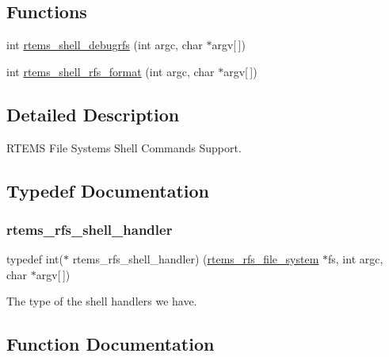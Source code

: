 \subsection*{Functions}
\begin{DoxyCompactItemize}
\item 
int \mbox{\hyperlink{rtems-rfs-shell_8c_a39d9f39a696171d278ab3fb462043af6}{rtems\+\_\+shell\+\_\+debugrfs}} (int argc, char $\ast$argv\mbox{[}$\,$\mbox{]})
\item 
int \mbox{\hyperlink{rtems-rfs-shell_8c_a75c5255512bc39c837a5d516ef4356c2}{rtems\+\_\+shell\+\_\+rfs\+\_\+format}} (int argc, char $\ast$argv\mbox{[}$\,$\mbox{]})
\end{DoxyCompactItemize}


\subsection{Detailed Description}
R\+T\+E\+MS File Systems Shell Commands Support. 



\subsection{Typedef Documentation}
\mbox{\label{rtems-rfs-shell_8c_ae8b3b669ad0ff98c8773ddd56bb66f32}} 
\subsubsection{\texorpdfstring{rtems\_rfs\_shell\_handler}{rtems\_rfs\_shell\_handler}}
{\footnotesize\ttfamily typedef int($\ast$ rtems\+\_\+rfs\+\_\+shell\+\_\+handler) (\mbox{\hyperlink{struct__rtems__rfs__file__system}{rtems\+\_\+rfs\+\_\+file\+\_\+system}} $\ast$fs, int argc, char $\ast$argv\mbox{[}$\,$\mbox{]})}

The type of the shell handlers we have. 

\subsection{Function Documentation}
\mbox{\label{rtems-rfs-shell_8c_a39d9f39a696171d278ab3fb462043af6}} 
